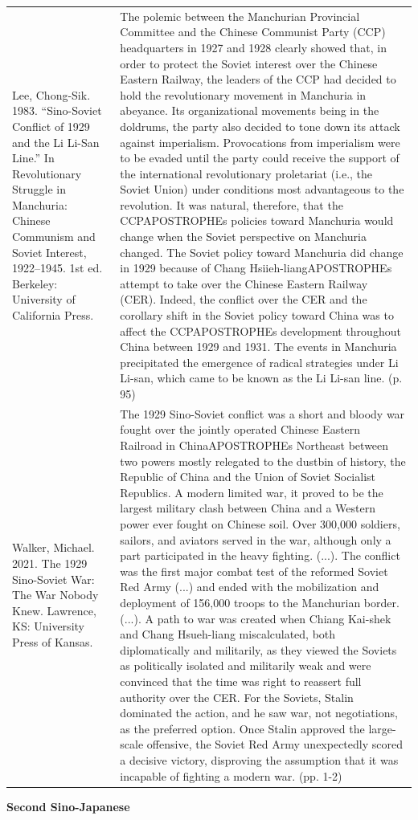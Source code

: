 {\begin{longtable}{p{}p{}}
\\
Lee, Chong-Sik. 1983. “Sino-Soviet Conflict of 1929 and the Li Li-San Line.” In Revolutionary Struggle in Manchuria: Chinese Communism and Soviet Interest, 1922–1945. 1st ed. Berkeley: University of California Press. & The polemic between the Manchurian Provincial Committee and the Chinese Communist Party (CCP) headquarters in 1927 and 1928 clearly showed that, in order to protect the Soviet interest over the Chinese Eastern Railway, the leaders of the CCP had decided to hold the revolutionary movement in Manchuria in abeyance. Its organizational movements being in the doldrums, the party also decided to tone down its attack against imperialism. Provocations from imperialism were to be evaded until the party could receive the support of the international revolutionary proletariat (i.e., the Soviet Union) under conditions most advantageous to the revolution. It was natural, therefore, that the CCPAPOSTROPHEs policies toward Manchuria would change when the Soviet perspective on Manchuria changed. The Soviet policy toward Manchuria did change in 1929 because of Chang Hsiieh-liangAPOSTROPHEs attempt to take over the Chinese Eastern Railway (CER). Indeed, the conflict over the CER and the corollary shift in the Soviet policy toward China was to affect the CCPAPOSTROPHEs development throughout China between 1929 and 1931. The events in Manchuria precipitated the emergence of radical strategies under Li Li-san, which came to be known as the Li Li-san line. (p. 95)
\\
Walker, Michael. 2021. The 1929 Sino-Soviet War: The War Nobody Knew. Lawrence, KS: University Press of Kansas. & The 1929 Sino-Soviet conflict was a short and bloody war fought over the jointly operated Chinese Eastern Railroad in ChinaAPOSTROPHEs Northeast between two powers mostly relegated to the dustbin of history, the Republic of China and the Union of Soviet Socialist Republics. A modern limited war, it proved to be the largest military clash between China and a Western power ever fought on Chinese soil. Over 300,000 soldiers, sailors, and aviators served in the war, although only a part participated in the heavy fighting. (...). The conflict was the first major combat test of the reformed Soviet Red Army (...) and ended with the mobilization and deployment of 156,000 troops to the Manchurian border. (...). A path to war was created when Chiang Kai-shek and Chang Hsueh-liang miscalculated, both diplomatically and militarily, as they viewed the Soviets as politically isolated and militarily weak and were convinced that the time was right to reassert full authority over the CER. For the Soviets, Stalin dominated the action, and he saw war, not negotiations, as the preferred option. Once Stalin approved the large-scale offensive, the Soviet Red Army unexpectedly scored a decisive victory, disproving the assumption that it was incapable of fighting a modern war. (pp. 1-2)
\\
\end{longtable}}
\clearpage
         \textbf{Second Sino-Japanese} 

